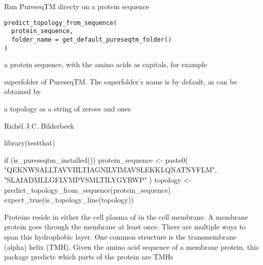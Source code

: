 \documentclass[letterpaper]{book}
\begin{document}
%
\begin{Description}\relax
Run PureseqTM directy on a protein sequence
\end{Description}
%
\begin{Usage}
\begin{verbatim}
predict_topology_from_sequence(
  protein_sequence,
  folder_name = get_default_pureseqtm_folder()
)
\end{verbatim}
\end{Usage}
%
\begin{Arguments}
\begin{ldescription}
\item[\code{protein\_sequence}] a protein sequence, with
the amino acids as capitals, for
example 

\item[\code{folder\_name}] superfolder of PureseqTM.
The superfolder's name is 
by default, as can be obtained by
\end{ldescription}
\end{Arguments}
%
\begin{Value}
a topology as a string of zeroes and ones
\end{Value}
%
\begin{Author}\relax
Richèl J.C. Bilderbeek
\end{Author}
%
\begin{Examples}
\begin{ExampleCode}
library(testthat)

if (is_pureseqtm_installed()) {
  protein_sequence <- paste0(
    "QEKNWSALLTAVVIILTIAGNILVIMAVSLEKKLQNATNYFLM",
    "SLAIADMLLGFLVMPVSMLTILYGYRWP"
  )
  topology <- predict_topology_from_sequence(protein_sequence)
  expect_true(is_topology_line(topology))
}
\end{ExampleCode}
\end{Examples}
%
\begin{Description}\relax
Proteins reside in either the cell plasma of in the
cell membrane. A membrane protein goes through the
membrane at least once. There are multiple ways to span this
hydrophobic layer. One common structure is the transmembrane (alpha)
helix (TMH). Given the amino acid sequence of a membrane protein, this
package predicts which parts of the protein are TMHs
\end{Description}
\end{document}
